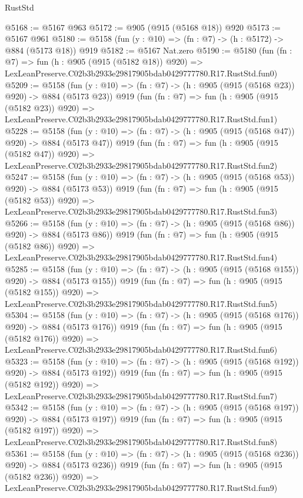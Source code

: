 \begin{lexlean}{RustStd}
\begin{coremodule}
@5168 := @5167 @963
@5172 := @905 (@915 (@5168 @18)) @920
@5173 := @5167 @961
@5180 := @5158 (fun (y : @10) => (fn : @7) -> (h : @5172) -> @884 (@5173 @18)) @919
@5182 := @5167 Nat.zero
@5190 := @5180
    (fun (fn : @7) =>
    fun (h : @905 (@915 (@5182 @18)) @920) =>
    LexLeanPreserve.C02b3b2933e29817905bdab0429777780.R17.RustStd.fun0)
@5209 := @5158
    (fun (y : @10) => (fn : @7) -> (h : @905 (@915 (@5168 @23)) @920) -> @884 (@5173 @23))
    @919
    (fun (fn : @7) =>
    fun (h : @905 (@915 (@5182 @23)) @920) =>
    LexLeanPreserve.C02b3b2933e29817905bdab0429777780.R17.RustStd.fun1)
@5228 := @5158
    (fun (y : @10) => (fn : @7) -> (h : @905 (@915 (@5168 @47)) @920) -> @884 (@5173 @47))
    @919
    (fun (fn : @7) =>
    fun (h : @905 (@915 (@5182 @47)) @920) =>
    LexLeanPreserve.C02b3b2933e29817905bdab0429777780.R17.RustStd.fun2)
@5247 := @5158
    (fun (y : @10) => (fn : @7) -> (h : @905 (@915 (@5168 @53)) @920) -> @884 (@5173 @53))
    @919
    (fun (fn : @7) =>
    fun (h : @905 (@915 (@5182 @53)) @920) =>
    LexLeanPreserve.C02b3b2933e29817905bdab0429777780.R17.RustStd.fun3)
@5266 := @5158
    (fun (y : @10) => (fn : @7) -> (h : @905 (@915 (@5168 @86)) @920) -> @884 (@5173 @86))
    @919
    (fun (fn : @7) =>
    fun (h : @905 (@915 (@5182 @86)) @920) =>
    LexLeanPreserve.C02b3b2933e29817905bdab0429777780.R17.RustStd.fun4)
@5285 := @5158
    (fun (y : @10) => (fn : @7) -> (h : @905 (@915 (@5168 @155)) @920) -> @884 (@5173 @155))
    @919
    (fun (fn : @7) =>
    fun (h : @905 (@915 (@5182 @155)) @920) =>
    LexLeanPreserve.C02b3b2933e29817905bdab0429777780.R17.RustStd.fun5)
@5304 := @5158
    (fun (y : @10) => (fn : @7) -> (h : @905 (@915 (@5168 @176)) @920) -> @884 (@5173 @176))
    @919
    (fun (fn : @7) =>
    fun (h : @905 (@915 (@5182 @176)) @920) =>
    LexLeanPreserve.C02b3b2933e29817905bdab0429777780.R17.RustStd.fun6)
@5323 := @5158
    (fun (y : @10) => (fn : @7) -> (h : @905 (@915 (@5168 @192)) @920) -> @884 (@5173 @192))
    @919
    (fun (fn : @7) =>
    fun (h : @905 (@915 (@5182 @192)) @920) =>
    LexLeanPreserve.C02b3b2933e29817905bdab0429777780.R17.RustStd.fun7)
@5342 := @5158
    (fun (y : @10) => (fn : @7) -> (h : @905 (@915 (@5168 @197)) @920) -> @884 (@5173 @197))
    @919
    (fun (fn : @7) =>
    fun (h : @905 (@915 (@5182 @197)) @920) =>
    LexLeanPreserve.C02b3b2933e29817905bdab0429777780.R17.RustStd.fun8)
@5361 := @5158
    (fun (y : @10) => (fn : @7) -> (h : @905 (@915 (@5168 @236)) @920) -> @884 (@5173 @236))
    @919
    (fun (fn : @7) =>
    fun (h : @905 (@915 (@5182 @236)) @920) =>
    LexLeanPreserve.C02b3b2933e29817905bdab0429777780.R17.RustStd.fun9)

\end{coremodule}
\end{lexlean}
